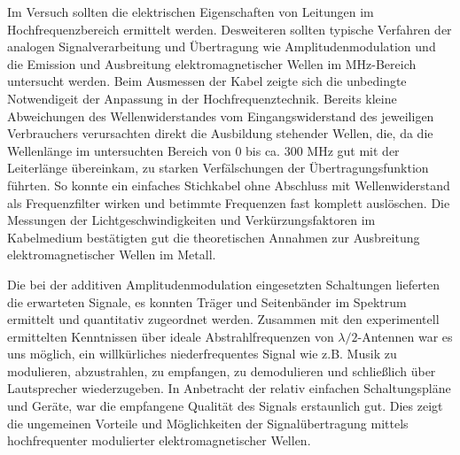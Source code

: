 Im Versuch sollten die elektrischen Eigenschaften von Leitungen im Hochfrequenzbereich ermittelt werden. 
Desweiteren sollten typische Verfahren der analogen Signalverarbeitung und Übertragung wie Amplitudenmodulation und die Emission und Ausbreitung elektromagnetischer Wellen im MHz-Bereich untersucht werden.
Beim Ausmessen der Kabel zeigte sich die unbedingte Notwendigeit der Anpassung in der Hochfrequenztechnik.
Bereits kleine Abweichungen des Wellenwiderstandes vom Eingangswiderstand des jeweiligen Verbrauchers verursachten direkt die Ausbildung stehender Wellen, die, da die Wellenlänge im untersuchten Bereich von 0 bis ca. 300 MHz gut mit der Leiterlänge übereinkam, zu starken Verfälschungen der Übertragungsfunktion führten. 
So konnte ein einfaches Stichkabel ohne Abschluss mit Wellenwiderstand als Frequenzfilter wirken und betimmte Frequenzen fast komplett auslöschen.
Die Messungen der Lichtgeschwindigkeiten und Verkürzungsfaktoren im Kabelmedium bestätigten gut die theoretischen Annahmen zur Ausbreitung elektromagnetischer Wellen im Metall.

Die bei der additiven Amplitudenmodulation eingesetzten Schaltungen lieferten die erwarteten Signale, es konnten Träger und Seitenbänder im Spektrum ermittelt und quantitativ zugeordnet werden.
Zusammen mit den experimentell ermittelten Kenntnissen über ideale Abstrahlfrequenzen von $\lambda /2$-Antennen war es uns möglich, ein willkürliches niederfrequentes Signal wie z.B. Musik zu modulieren, abzustrahlen, zu empfangen, zu demodulieren und schließlich über Lautsprecher wiederzugeben. 
In Anbetracht der relativ einfachen Schaltungspläne und Geräte, war die empfangene Qualität des Signals erstaunlich gut.
Dies zeigt die ungemeinen Vorteile und Möglichkeiten der Signalübertragung mittels hochfrequenter modulierter elektromagnetischer Wellen.